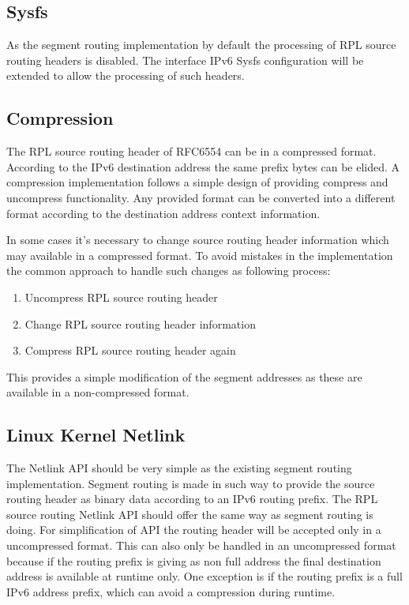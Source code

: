 \documentclass[letterpaper]{article}
\begin{document}
\subsection{Sysfs}

As the segment routing implementation by default the processing of RPL source routing headers is disabled.
The interface IPv6 Sysfs configuration will be extended to allow the processing of such headers.

\subsection{Compression}

The RPL source routing header of RFC6554 can be in a compressed format.
According to the IPv6 destination address the same prefix bytes can be elided.
A compression implementation follows a simple design of providing compress and uncompress functionality.
Any provided format can be converted into a different format according to the destination address context information.

In some cases it's necessary to change source routing header information which may available in a compressed format.
To avoid mistakes in the implementation the common approach to handle such changes as following process:

\begin{enumerate}
\item{Uncompress RPL source routing header}
\item{Change RPL source routing header information}
\item{Compress RPL source routing header again}
\end{enumerate}

This provides a simple modification of the segment addresses as these are available in a non-compressed format.

\subsection{Linux Kernel Netlink}

The Netlink API should be very simple as the existing segment routing implementation.
Segment routing is made in such way to provide the source routing header as binary data according to an IPv6 routing prefix.
The RPL source routing Netlink API should offer the same way as segment routing is doing.
For simplification of API the routing header will be accepted only in a uncompressed format.
This can also only be handled in an uncompressed format because if the routing prefix is giving as non full address the final destination address is available at runtime only.
One exception is if the routing prefix is a full IPv6 address prefix, which can avoid a compression during runtime.
\end{document}
